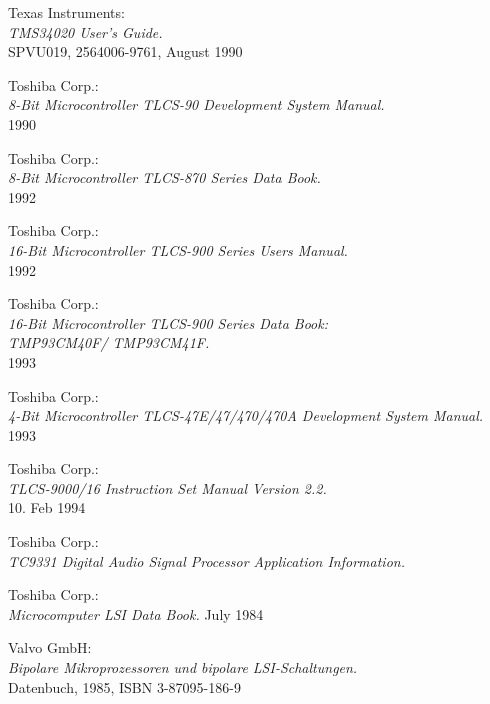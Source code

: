  Texas Instruments: \\
                     {\em TMS34020 User's Guide.\/} \\
                     SPVU019, 2564006-9761, August 1990

 Toshiba Corp.: \\
                 {\em 8-Bit Microcontroller TLCS-90 Development System
                 Manual.\/} \\
                 1990

 Toshiba Corp.: \\
                  {\em 8-Bit Microcontroller TLCS-870 Series Data
                  Book.\/} \\
                  1992

 Toshiba Corp.: \\
                  {\em 16-Bit Microcontroller TLCS-900 Series Users
                  Manual.\/} \\
                  1992

 Toshiba Corp.: \\
                   {\em 16-Bit Microcontroller TLCS-900 Series Data Book: \\
                    TMP93CM40F/ TMP93CM41F.\/} \\
                   1993

 Toshiba Corp.: \\
                 {\em 4-Bit Microcontroller TLCS-47E/47/470/470A Development
                  System Manual.\/} \\
                 1993

 Toshiba Corp.: \\
                   {\em TLCS-9000/16 Instruction Set Manual Version
                   2.2.\/} \\
                   10. Feb 1994

 Toshiba Corp.: \\
                   {\em TC9331 Digital Audio Signal Processor
                   Application Information.}

 Toshiba Corp.: \\
                   {\em Microcomputer LSI Data Book.}
                   July 1984

 Valvo GmbH: \\
                {\em Bipolare Mikroprozessoren und bipolare
                LSI-Schaltungen.\/} \\
                Datenbuch, 1985, ISBN 3-87095-186-9

